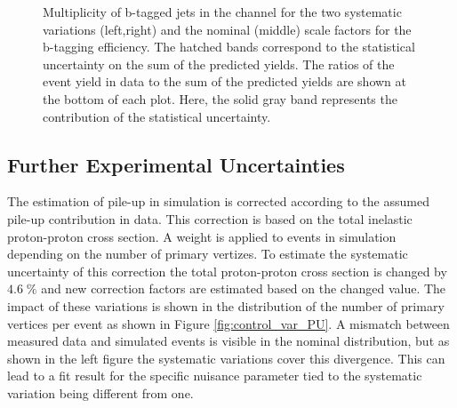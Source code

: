 \begin{figure}[htbp!]
\begin{center}
\caption{Multiplicity of b-tagged jets in the \emu channel for the two systematic variations (left,right) and the nominal (middle) scale factors for the b-tagging efficiency.
The hatched bands correspond to the statistical uncertainty on the sum of the predicted yields. 
        The ratios of the event yield in data to the sum of the predicted yields are
        shown at the bottom of each plot. Here, the solid gray band
        represents the contribution of the statistical uncertainty.
  \label{fig:control_var_BTAGH}}
  \end{center}
\end{figure}


\subsection{Further Experimental Uncertainties}

The estimation of pile-up in simulation is corrected according to the assumed pile-up contribution in data. This correction is based on the total inelastic proton-proton cross section.
A weight is applied to events in simulation depending on the number of primary vertizes. To estimate the systematic uncertainty of this correction the total proton-proton cross section is changed
by $4.6 \; \%$ and new correction factors are estimated based on the changed value.
The impact of these variations is shown in the distribution of the number of primary vertices per event as shown in Figure \ref{fig:control_var_PU}.
A mismatch between measured data and simulated events is visible in the nominal distribution, but as shown in the left figure the systematic variations cover this divergence.
This can lead to a fit result for the specific nuisance parameter tied to the systematic variation being different from one.

